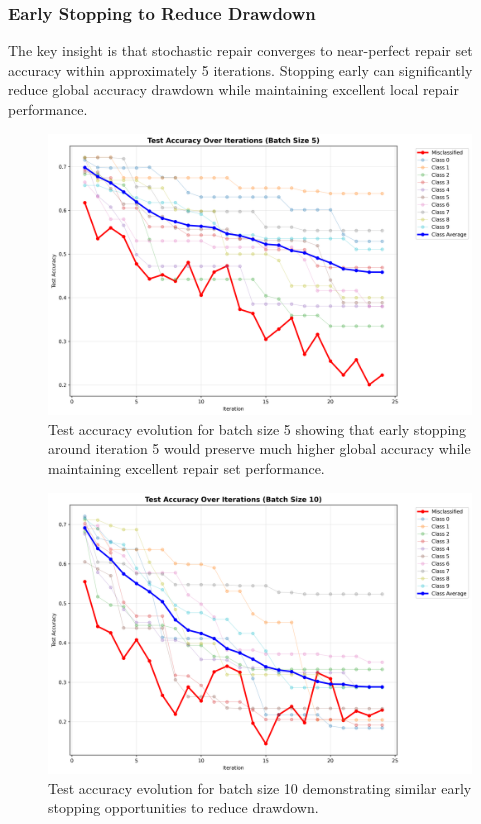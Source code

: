 \documentclass{article}
\begin{document}
\subsubsection{Early Stopping to Reduce Drawdown}

The key insight is that stochastic repair converges to near-perfect repair set accuracy within approximately 5 iterations. Stopping early can significantly reduce global accuracy drawdown while maintaining excellent local repair performance.

\begin{figure}[h]
	\centering
	\includegraphics[width=\textwidth]{results/stochastic_analysis/batch_iterations/test_accuracy_batch_5.png}
	\caption{Test accuracy evolution for batch size 5 showing that early stopping around iteration 5 would preserve much higher global accuracy while maintaining excellent repair set performance.}
	\label{fig:early_stopping_batch_5}
\end{figure}

\begin{figure}[h]
	\centering
	\includegraphics[width=\textwidth]{results/stochastic_analysis/batch_iterations/test_accuracy_batch_10.png}
	\caption{Test accuracy evolution for batch size 10 demonstrating similar early stopping opportunities to reduce drawdown.}
	\label{fig:early_stopping_batch_10}
\end{figure}
\end{document}
